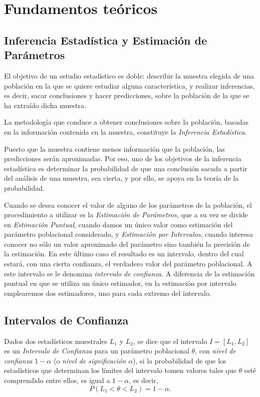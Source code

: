 \documentclass[a4paper]{article}
\begin{document}
\sloppy
{}
\bigskip

\section*{Fundamentos teóricos}

\subsection*{Inferencia Estadística y Estimación de Parámetros}
El objetivo de un estudio estadístico es doble: describir la
muestra elegida de una población en la que se quiere estudiar
alguna característica, y realizar inferencias, es decir, sacar
conclusiones y hacer predicciones, sobre la población de la
que se ha extraído dicha muestra.

La metodología que conduce a obtener conclusiones sobre la
población, basadas en la información contenida en la
muestra, constituye la \emph{Inferencia Estadística}.

Puesto que la muestra contiene menos información que la
población, las predicciones serán aproximadas. Por eso,
uno de los objetivos de la inferencia estadística es
determinar la probabilidad de que una conclusión sacada a
partir del análisis de una muestra, sea cierta, y por ello, se
apoya en la teoría de la probabilidad.

Cuando se desea conocer el valor de alguno de los parámetros
de la población, el procedimiento a utilizar es la
\emph{Estimación de Parámetros, }que a su vez se divide en
\emph{Estimación Puntual}, cuando damos un único valor
como estimación del parámetro poblacional considerado, y
\emph{Estimación por Intervalos}, cuando interesa conocer no
sólo un valor aproximado del parámetro sino también la
precisión de la estimación. En este último caso el
resultado es un intervalo, dentro del cual estará, con una
cierta confianza, el verdadero valor del parámetro
poblacional. A este intervalo se le denomina \emph{intervalo de
confianza}. A diferencia de la estimación puntual en que se
utiliza un único estimador, en la estimación por intervalo
emplearemos dos estimadores, uno para cada extremo del intervalo.

\subsection*{Intervalos de Confianza}
Dados dos estadísticos muestrales $L_1$ y $L_2$, se dice que el intervalo $I=[L_1,L_2]$ es un \emph{Intervalo de Confianza} para un parámetro poblacional
$\theta$, con \emph{nivel de confianza} $1-\alpha$ (o \emph{nivel de
significación} $\alpha $), si la probabilidad de que los estadísticos que determinan los límites del intervalo tomen valores tales que $\theta$ esté comprendido entre ellos, es igual a $1-\alpha$, es decir,
\[
P\left( L_{1}<\theta <L_{2}\right) =1-\alpha.
\]
\end{document}
